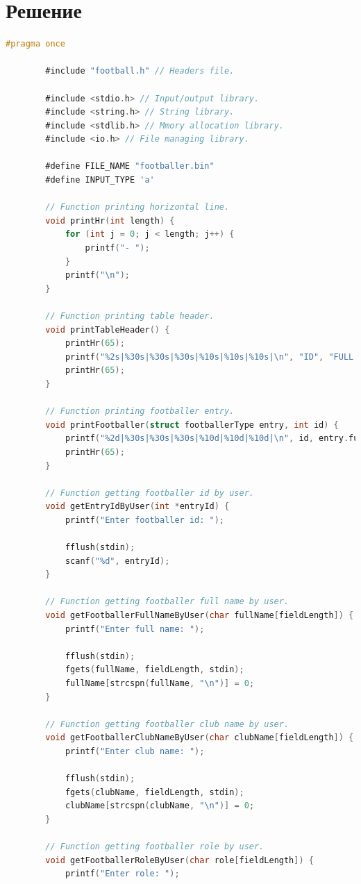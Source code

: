 \documentclass[12pt]{article}
\begin{document}
	\section*{Решение}
	
	\begin{lstlisting}[language=C]
		#pragma once
		
		#include "football.h" // Headers file.
		
		#include <stdio.h> // Input/output library.
		#include <string.h> // String library.
		#include <stdlib.h> // Mmory allocation library.
		#include <io.h> // File managing library.
		
		#define FILE_NAME "footballer.bin" 
		#define INPUT_TYPE 'a'
		
		// Function printing horizontal line.
		void printHr(int length) {
			for (int j = 0; j < length; j++) {
				printf("- ");
			}
			printf("\n");
		}
		
		// Function printing table header.
		void printTableHeader() {
			printHr(65);
			printf("%2s|%30s|%30s|%30s|%10s|%10s|%10s|\n", "ID", "FULL NAME", "CLUB NAME", "ROLE", "AGE", "GAMES", "GOALS");
			printHr(65);
		}
		
		// Function printing footballer entry.
		void printFootballer(struct footballerType entry, int id) {
			printf("%2d|%30s|%30s|%30s|%10d|%10d|%10d|\n", id, entry.fullName, entry.clubName, entry.role, entry.age, entry.numberOfGames, entry.numberOfGoals);
			printHr(65);
		}
		
		// Function getting footballer id by user.
		void getEntryIdByUser(int *entryId) {
			printf("Enter footballer id: ");
			
			fflush(stdin);
			scanf("%d", entryId);
		}
		
		// Function getting footballer full name by user.
		void getFootballerFullNameByUser(char fullName[fieldLength]) {
			printf("Enter full name: ");
			
			fflush(stdin);
			fgets(fullName, fieldLength, stdin);
			fullName[strcspn(fullName, "\n")] = 0;
		}
		
		// Function getting footballer club name by user.
		void getFootballerClubNameByUser(char clubName[fieldLength]) {
			printf("Enter club name: ");
			
			fflush(stdin);
			fgets(clubName, fieldLength, stdin);
			clubName[strcspn(clubName, "\n")] = 0;
		}
		
		// Function getting footballer role by user.
		void getFootballerRoleByUser(char role[fieldLength]) {
			printf("Enter role: ");
			

\end{lstlisting}
\end{document}
